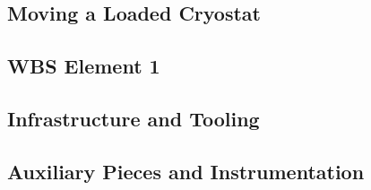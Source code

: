 

\subsection{Moving a Loaded Cryostat}
\label{sec:prism-des-move}


\subsection{WBS Element 1}
\label{sec:prism-des-wbs1}

\subsection{Infrastructure and Tooling}
\label{sec:prism-des-infr}

\subsection{Auxiliary Pieces and Instrumentation}
\label{sec:prism-des-aux}


